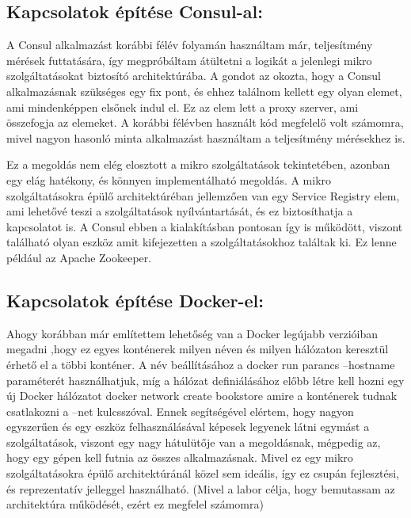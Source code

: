 \documentclass[]{article}
\begin{document}
\subsection{Kapcsolatok építése
Consul-al:}\label{kapcsolatok-uxe9puxedtuxe9se-consul-al}

A Consul alkalmazást korábbi félév folyamán használtam már, teljesítmény
mérések futtatására, így megpróbáltam átültetni a logikát a jelenlegi
mikro szolgáltatásokat biztosító architektúrába. A gondot az okozta,
hogy a Consul alkalmazásnak szükséges egy fix pont, és ehhez találnom
kellett egy olyan elemet, ami mindenképpen elsőnek indul el. Ez az elem
lett a proxy szerver, ami összefogja az elemeket. A korábbi félévben
használt kód megfelelő volt számomra, mivel nagyon hasonló minta
alkalmazást használtam a teljesítmény mérésekhez is.

Ez a megoldás nem elég elosztott a mikro szolgáltatások tekintetében,
azonban egy elág hatékony, és könnyen implementálható megoldás. A mikro
szolgáltatásokra épülő architektúréban jellemzően van egy Service
Registry elem, ami lehetővé teszi a szolgáltatások nyílvántartását, és
ez biztosíthatja a kapcsolatot is. A Consul ebben a kialakításban
pontosan így is működött, viszont található olyan eszköz amit
kifejezetten a szolgáltatásokhoz találtak ki. Ez lenne például az Apache
Zookeeper.

\subsection{Kapcsolatok építése
Docker-el:}\label{kapcsolatok-uxe9puxedtuxe9se-docker-el}

Ahogy korábban már említettem lehetőség van a Docker legújabb verzióiban
megadni ,hogy ez egyes konténerek milyen néven és milyen hálózaton
keresztül érhető el a többi konténer. A név beállításához a docker run
parancs --hostname paraméterét használhatjuk, míg a hálózat
definiálásához előbb létre kell hozni egy új Docker hálózatot docker
network create bookstore amire a konténerek tudnak csatlakozni a --net
kulcsszóval. Ennek segítségével elértem, hogy nagyon egyszerűen és egy
eszköz felhasználásával képesek legyenek látni egymást a szolgáltatások,
viszont egy nagy hátulütője van a megoldásnak, mégpedig az, hogy egy
gépen kell futnia az összes alkalmazásnak. Mivel ez egy mikro
szolgáltatásokra épülő architektúránál közel sem ideális, így ez csupán
fejlesztési, és reprezentatív jelleggel használható. (Mivel a labor
célja, hogy bemutassam az architektúra működését, ezért ez megfelel
számomra)
\end{document}
